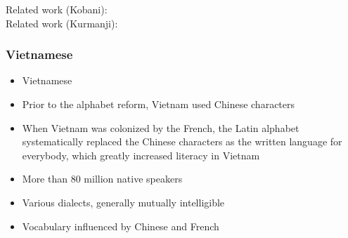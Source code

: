 \documentclass[aspectratio=169]{beamer}
\begin{document}
\begin{frame}[fragile]
    \vspace{0.7cm}
    \begin{minipage}{1.0\textwidth}
    \centering
    \footnotesize
    Related work (Kobani): \citep{ahmad2023AnalysisPhonologyMorphology, najem-aldin2021IzafeKobaniVariety} \\
    Related work (Kurmanji): \citep{morad2024PartofSpeechTaggingNorthern, gokirmak2017DependencyTreebankKurmanjia, hassani2021CanLinguisticDistance, haig2018KurmanjiKurdishTurkey, herkenrath2022MultilingualCorpusApproach, ameen2023AssessingQualityMachine, gupta2022ProgressMultilingualSpeech, thackston2006KurmanjiKurdishReference}
    \end{minipage}
\end{frame}

\begin{frame}[fragile]
	\frametitle{Vietnamese}
    \begin{minipage}{.70\textwidth}
    \centering
    \begin{itemize}
        \item Vietnamese %
        \item Prior to the alphabet reform, Vietnam used Chinese characters %
        \item When Vietnam was colonized by the French, the Latin alphabet%
        systematically replaced the Chinese characters as the written language for everybody, which greatly increased literacy in Vietnam
        \item More than 80 million native speakers
        \item Various dialects, generally mutually intelligible
        \item Vocabulary influenced by Chinese and French
    \end{itemize}
    \end{minipage}%
    \begin{minipage}{.30\textwidth}
      \begin{figure}
        \centering

\end{figure}
\end{minipage}
\end{frame}
\end{document}
